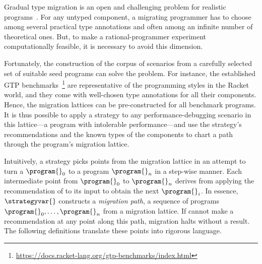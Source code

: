 \newcommand{\gtpurl}{\url{https://docs.racket-lang.org/gtp-benchmarks/index.html}}

Gradual type migration is an open and challenging problem for realistic
programs~\cite{rch:in-out-infer-gt, km:ts-type-evo,
mp:gt-decidable, ccew:gt-migrate, gc:gt-infer,
cagg-solver-based-migration,clps-popl-2020,js-infer,ruby-static-infer,unif-infer,
msi:gt-infer-hm,dyn-infer-ruby,profile-guided-typing,jstrace,gen-ts-decl,
lambdanet,nl2ptype,learn-types-big-data,ml-ts}. For
any untyped component, a migrating programmer has to choose among several
practical type annotations and often among an infinite number of theoretical
ones. But, to make a rational-programmer experiment computationally feasible, it
is necessary to avoid this dimension.

Fortunately, the construction of the corpus of scenarios from a carefully
selected set of suitable seed programs can solve the problem. For
instance, the established GTP
benchmarks~\cite{gtnffvf-jfp-2019,g-rep-2023}\footnote{\gtpurl{}} are
representative of the programming styles in the Racket world, and they
come with well-chosen type annotations for all their components.  Hence,
the migration lattices can be pre-constructed for all benchmark programs.
It is thus possible to apply a strategy to any performance-debugging
scenario in this lattice---a program with intolerable performance---and
use the strategy's recommendations and the known types of the components
to chart a path through the program's migration lattice.

Intuitively,  a strategy \strategyvar{} picks points from the migration
lattice in an attempt to turn a $\program{}_0$ to a program $\program{}_n$
in  a step-wise manner. Each intermediate point from $\program{}_0$ to
$\program{}_n$ derives from applying the recommendation of \strategyvar{}
to its input to obtain the next $\program{}_i$.  In essence,
$\strategyvar{}$ constructs a \emph{migration path}, a sequence of
programs ${\program{}_0}, \ldots, {\program{}_n}$ from a migration
lattice. If \strategyvar{} cannot make a recommendation at any point along
this path, migration halts without a result. The following
definitions translate these points into rigorous language. 

